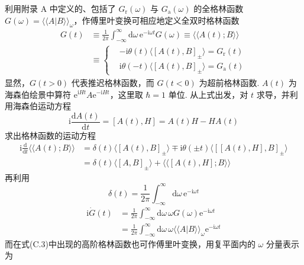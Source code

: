 利用附录 A 中定义的、包括了 $G_{\mathrm{r}}(\omega)$ 与 $G_{\mathrm{a}}(\omega)$ 的全格林函数 $G(\omega)=\langle\langle A|B\rangle\rangle_{\omega}$，作傅里叶变换可相应地定义全双时格林函数
\begin{equation}
\begin{aligned}
G(t)&\equiv\frac{1}{2\pi}\int_{-\infty}^{\infty}
\mathrm{d}\omega\,\mathrm{e}^{-\mathrm{i}\omega t}G(\omega)
\equiv\langle\langle A(t);B\rangle\rangle\\
&\equiv\left\{
\begin{aligned}
&-\mathrm{i}\theta(t)\langle[A(t),B]_{\pm}\rangle
=G_{\mathrm{r}}(t)\\
&\mathrm{i}\theta(-t)\langle[A(t),B]_{\pm}\rangle
=G_{\mathrm{a}}(t)
\end{aligned}\right.
\end{aligned}
\end{equation}
显然，$G(t>0)$ 代表推迟格林函数，而 $G(t<0)$ 为超前格林函数. $A(t)$ 为海森伯绘景中算符 $\mathrm{e}^{\mathrm{i}Ht}A\mathrm{e}^{-\mathrm{i}Ht}$，这里取 $\hbar=1$ 单位. 从上式出发，对 $t$ 求导，并利用海森伯运动方程
\begin{equation}
\mathrm{i}\frac{\mathrm{d}A(t)}{\mathrm{d}t}
=[A(t),H]=A(t)H-HA(t)
\end{equation}
求出格林函数的运动方程
\begin{equation}
\begin{aligned}
\mathrm{i}\frac{\mathrm{d}}{\mathrm{d}t}
\langle\langle A(t);B\rangle\rangle
&=\delta(t)\langle[A(t),B]_{\pm}\rangle
\mp\mathrm{i}\theta(\pm t)
\langle[[A(t),H],B]_{\pm}\rangle\\
&=\delta(t)\langle[A,B]_{\pm}\rangle
+\langle\langle[A(t),H];B\rangle\rangle
\end{aligned}
\end{equation}
再利用
\begin{equation}
\delta(t)=\frac{1}{2\pi}\int_{-\infty}^{\infty}
\mathrm{d}\omega\,\mathrm{e}^{-\mathrm{i}\omega t}
\end{equation}
\begin{equation}
\begin{aligned}
\mathrm{i}\dot{G}(t)&=\frac{1}{2\pi}\int_{-\infty}^{\infty}
\mathrm{d}\omega\,\omega G(\omega)\mathrm{e}^{-\mathrm{i}\omega t}\\
&=\frac{1}{2\pi}\int_{-\infty}^{\infty}\mathrm{d}\omega\,\omega
\langle\langle A|B\rangle\rangle_{\omega}\mathrm{e}^{-\mathrm{i}\omega t}
\end{aligned}
\end{equation}
而在式(C.3)中出现的高阶格林函数也可作傅里叶变换，用复平面内的 $\omega$ 分量表示为
